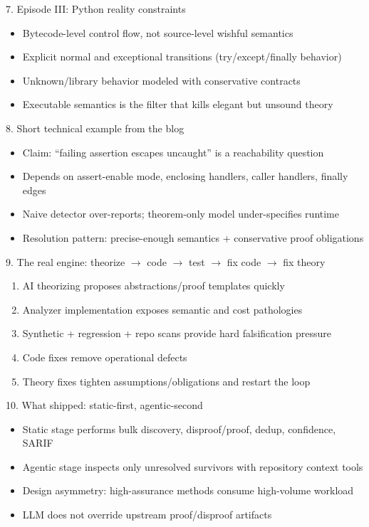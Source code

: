 \documentclass[aspectratio=169]{beamer}
\begin{document}
\begin{frame}{7. Episode III: Python reality constraints}
\begin{itemize}
  \item Bytecode-level control flow, not source-level wishful semantics
  \item Explicit normal and exceptional transitions (try/except/finally behavior)
  \item Unknown/library behavior modeled with conservative contracts
  \item Executable semantics is the filter that kills elegant but unsound theory
\end{itemize}
\end{frame}

\begin{frame}{8. Short technical example from the blog}
\begin{itemize}
  \item Claim: ``failing assertion escapes uncaught'' is a reachability question
  \item Depends on assert-enable mode, enclosing handlers, caller handlers, finally edges
  \item Naive detector over-reports; theorem-only model under-specifies runtime
  \item Resolution pattern: precise-enough semantics + conservative proof obligations
\end{itemize}
\end{frame}

\begin{frame}{9. The real engine: theorize \(\rightarrow\) code \(\rightarrow\) test \(\rightarrow\) fix code \(\rightarrow\) fix theory}
\begin{enumerate}
  \item AI theorizing proposes abstractions/proof templates quickly
  \item Analyzer implementation exposes semantic and cost pathologies
  \item Synthetic + regression + repo scans provide hard falsification pressure
  \item Code fixes remove operational defects
  \item Theory fixes tighten assumptions/obligations and restart the loop
\end{enumerate}
\end{frame}

\begin{frame}{10. What shipped: static-first, agentic-second}
\begin{itemize}
  \item Static stage performs bulk discovery, disproof/proof, dedup, confidence, SARIF
  \item Agentic stage inspects only unresolved survivors with repository context tools
  \item Design asymmetry: high-assurance methods consume high-volume workload
  \item LLM does not override upstream proof/disproof artifacts
\end{itemize}
\end{frame}
\end{document}
